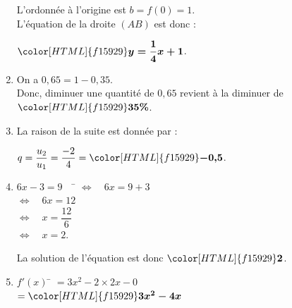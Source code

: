 \documentclass[a4paper,11pt,landscape,exos]{nsi} %
\begin{document}
\begin{multicols}{2}
\begin{enumerate}[]
\medskip
L'ordonnée à l'origine est $b=f(0)=1$.\\
L'équation de la droite $(AB)$ est donc :
\begin{center}
    $\color[HTML]{f15929}\boldsymbol{y=\dfrac{1}{4}x+1}$.
\end{center}
\item On a $0{,}65=1-0{,}35$.\\
    Donc, diminuer une quantité de $0{,}65$ revient à la diminuer de $\color[HTML]{f15929}\boldsymbol{35\%}$.
\item La raison de la suite est donnée par :
\begin{center}
    $q=\dfrac{u_2}{u_1}=\dfrac{-2}{4}=\color[HTML]{f15929}\boldsymbol{-0{,}5}$.
\end{center}
\item \begin{tabbing}
    $6x-3=9\quad$ \= $\iff \quad 6x=9+3$ \\
    \> $\iff \quad 6x=12$\\
    \> $\iff \quad x=\dfrac{12}{6}$\\
    \> $\iff \quad x=2$.
\end{tabbing}
La solution de l'équation est donc $\color[HTML]{f15929}\boldsymbol{2}$.
\item \begin{tabbing}
    $f'(x)$ \= $=3x^2-2\times 2x-0$\\
    \> $=\color[HTML]{f15929}\boldsymbol{3x^2-4x}$
\end{tabbing}

\vfill\null

\end{enumerate}

\end{multicols}
\end{document}
